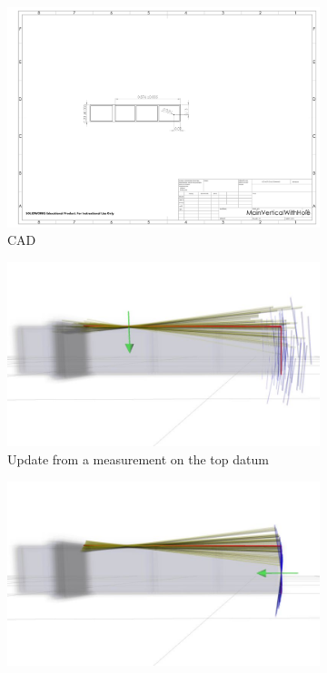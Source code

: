 \documentclass[../thesis.tex]{subfiles}
\begin{document}
\begin{figure}
  \centering
  \begin{subfigure}[b]{.9\linewidth}
    \includegraphics[width=\linewidth, clip, trim=4in 5in 6.5in 4.5in]{./Localization/MainVerticalWithHole}
    \caption{CAD}
    \label{fig:Overview:CAD}
  \end{subfigure}
  \hfill
  \begin{subfigure}[b]{.9\linewidth}
    \includegraphics[width=\linewidth, clip, trim=0.1in 1.5in 0.3in 1.3in]{./Localization/final_result_4_2}
    \caption{Update from a measurement on the top datum}
    \label{fig:Overview:belief_top}
  \end{subfigure}
  \hfill
  \begin{subfigure}[b]{.9\linewidth}
    \includegraphics[width=\linewidth, clip, trim=0.04in 1.5in 0.35in 1.3in]{./Localization/final_result_4_3}

\end{subfigure}
\end{figure}
\end{document}
